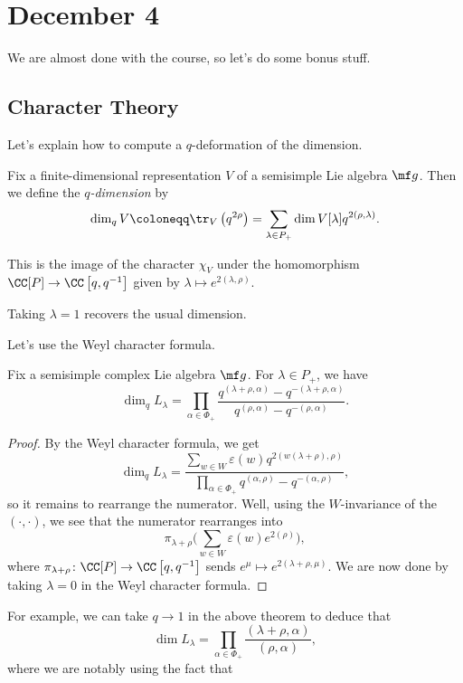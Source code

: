 \documentclass[../notes.tex]{subfiles}
\begin{document}
\section{December 4}
We are almost done with the course, so let's do some bonus stuff.

\subsection{Character Theory}
Let's explain how to compute a $q$-deformation of the dimension.
\begin{defihelper}[$q$-dimension] 
	Fix a finite-dimensional representation $V$ of a semisimple Lie algebra $\mf g$. Then we define the \textit{$q$-dimension} by
	\[\dim_qV\coloneqq\tr_V\left(q^{2\rho}\right)=\sum_{\lambda\in P_+}\dim V[\lambda]q^{2(\rho,\lambda)}.\]
\end{defihelper}
\begin{remark}
	This is the image of the character $\chi_V$ under the homomorphism $\CC[P]\to\CC\left[q,q^{-1}\right]$ given by $\lambda\mapsto e^{2(\lambda,\rho)}$.
\end{remark}
\begin{remark}
	Taking $\lambda=1$ recovers the usual dimension.
\end{remark}
Let's use the Weyl character formula.
\begin{theorem}
	Fix a semisimple complex Lie algebra $\mf g$. For $\lambda\in P_+$, we have
	\[\dim_qL_\lambda=\prod_{\alpha\in\Phi_+}\frac{q^{(\lambda+\rho,\alpha)}-q^{-(\lambda+\rho,\alpha)}}{q^{(\rho,\alpha)}-q^{-(\rho,\alpha)}}.\]
\end{theorem}
\begin{proof}
	By the Weyl character formula, we get
	\[\dim_qL_\lambda=\frac{\displaystyle\sum_{w\in W}\varepsilon(w)q^{2(w(\lambda+\rho),\rho)}}{\displaystyle\prod_{\alpha\in\Phi_+}q^{(\alpha,\rho)}-q^{-(\alpha,\rho)}},\]
	so it remains to rearrange the numerator. Well, using the $W$-invariance of the $(\cdot,\cdot)$, we see that the numerator rearranges into
	\[\pi_{\lambda+\rho}\Bigg(\sum_{w\in W}\varepsilon(w)e^{2(\rho)}\Bigg),\]
	where $\pi_{\lambda+\rho}\colon\CC[P]\to\CC\left[q,q^{-1}\right]$ sends $e^\mu\mapsto e^{2(\lambda+\rho,\mu)}$. We are now done by taking $\lambda=0$ in the Weyl character formula.
\end{proof}
For example, we can take $q\to1$ in the above theorem to deduce that
\[\dim L_\lambda=\prod_{\alpha\in\Phi_+}\frac{(\lambda+\rho,\alpha)}{(\rho,\alpha)},\]
where we are notably using the fact that
\end{document}
